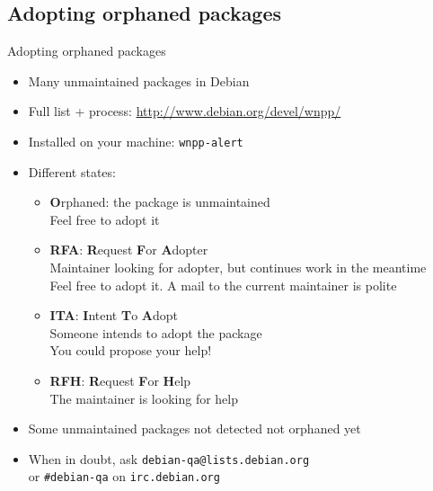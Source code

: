 \documentclass[10pt,final]{beamer}
\begin{document}
\subsection{Adopting orphaned packages}
\begin{frame}{Adopting orphaned packages}
      \hbr
  \begin{itemize}
    \item Many unmaintained packages in Debian
    \hbr
  \item Full list + process: \url{http://www.debian.org/devel/wnpp/}
    \hbr
  \item Installed on your machine: \texttt{wnpp-alert}
    \hbr
  \item Different states:
    \begin{itemize}
		    \small
    \item \textbf{O}rphaned: the package is unmaintained\\
      Feel free to adopt it
      \hbr
    \item \textbf{RFA}: \textbf{R}equest \textbf{F}or \textbf{A}dopter\\
      Maintainer looking for adopter, but continues work in the meantime\\
      Feel free to adopt it. A mail to the current maintainer is polite
      \hbr
    \item \textbf{ITA}: \textbf{I}ntent \textbf{T}o \textbf{A}dopt\\
      Someone intends to adopt the package\\
      You could propose your help!
      \hbr
    \item \textbf{RFH}: \textbf{R}equest \textbf{F}or \textbf{H}elp\\
      The maintainer is looking for help
    \end{itemize}
    \hbr
  \item Some unmaintained packages not detected \arr not orphaned yet
    \hbr
  \item When in doubt, ask \texttt{debian-qa@lists.debian.org} \\
    or \texttt{\#debian-qa} on \texttt{irc.debian.org}
  \end{itemize}
\end{frame}
\end{document}
